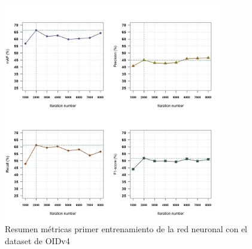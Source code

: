 \newpage

\begin{figure}[ht]
\centering
\includegraphics[width=0.85\textwidth]{img/chapters/resultados/metricas/metrics-train1.png}
\caption{\label{fig:metrics-train1}Resumen métricas primer entrenamiento de la red neuronal con el dataset de OIDv4}
\end{figure}

\newpage

